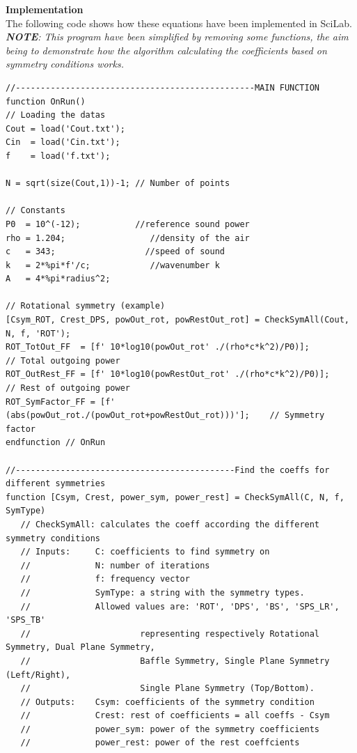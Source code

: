\documentclass{report}
\begin{document}
\begin{appendices}
\newpage

\textbf{Implementation} \\

The following code shows how these equations have been implemented in SciLab.\\
\textit{\textbf{NOTE}: This program have been simplified by removing some functions, the aim being to demonstrate how the algorithm calculating the coefficients based on symmetry conditions works.}

\lstset{language=SCilab} 
\begin{lstlisting}
//------------------------------------------------MAIN FUNCTION
function OnRun()
// Loading the datas
Cout = load('Cout.txt');
Cin  = load('Cin.txt');
f    = load('f.txt');

N = sqrt(size(Cout,1))-1; // Number of points

// Constants 
P0  = 10^(-12);		      //reference sound power
rho = 1.204;		         //density of the air
c   = 343;		            //speed of sound
k   = 2*%pi*f'/c;	         //wavenumber k
A   = 4*%pi*radius^2; 

// Rotational symmetry (example)
[Csym_ROT, Crest_DPS, powOut_rot, powRestOut_rot] = CheckSymAll(Cout, N, f, 'ROT');
ROT_TotOut_FF  = [f' 10*log10(powOut_rot' ./(rho*c*k^2)/P0)];        // Total outgoing power 
ROT_OutRest_FF = [f' 10*log10(powRestOut_rot' ./(rho*c*k^2)/P0)];    // Rest of outgoing power
ROT_SymFactor_FF = [f' (abs(powOut_rot./(powOut_rot+powRestOut_rot)))'];    // Symmetry factor
endfunction // OnRun

//--------------------------------------------Find the coeffs for different symmetries
function [Csym, Crest, power_sym, power_rest] = CheckSymAll(C, N, f, SymType)
   // CheckSymAll: calculates the coeff according the different symmetry conditions
   // Inputs:     C: coefficients to find symmetry on 
   //             N: number of iterations 
   //             f: frequency vector
   //             SymType: a string with the symmetry types. 
   //	          Allowed values are: 'ROT', 'DPS', 'BS', 'SPS_LR', 'SPS_TB' 
   //                      representing respectively Rotational Symmetry, Dual Plane Symmetry, 
   //                      Baffle Symmetry, Single Plane Symmetry (Left/Right),
   //					   Single Plane Symmetry (Top/Bottom).
   // Outputs:    Csym: coefficients of the symmetry condition
   //             Crest: rest of coefficients = all coeffs - Csym
   //             power_sym: power of the symmetry coefficients
   //             power_rest: power of the rest coeffcients   
   

\end{lstlisting}
\end{appendices}
\end{document}
